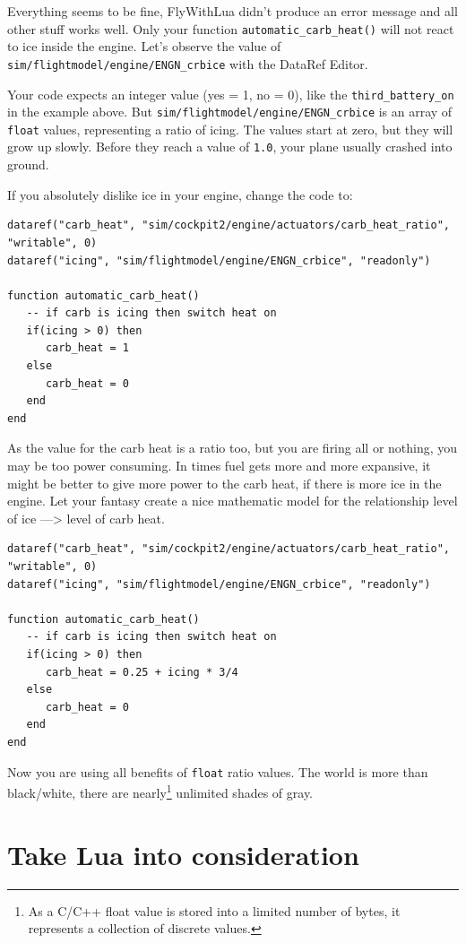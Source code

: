 \documentclass[11pt,parskip=half,a4paper]{scrartcl}
\begin{document}
Everything seems to be fine, FlyWithLua didn't produce an error message and all other stuff works well. Only your function \verb|automatic_carb_heat()| will not react to ice inside the engine. Let's observe the value of \verb|sim/flightmodel/engine/ENGN_crbice| with the DataRef Editor.

Your code expects an integer value (yes = 1, no = 0), like the \verb|third_battery_on| in the example above. But \verb|sim/flightmodel/engine/ENGN_crbice| is an array of \verb|float| values, representing a ratio of icing. The values start at zero, but they will grow up slowly. Before they reach a value of \verb|1.0|, your plane usually crashed into ground.

If you absolutely dislike ice in your engine, change the code to:

\begin{lstlisting}
dataref("carb_heat", "sim/cockpit2/engine/actuators/carb_heat_ratio", "writable", 0)
dataref("icing", "sim/flightmodel/engine/ENGN_crbice", "readonly")

function automatic_carb_heat()
   -- if carb is icing then switch heat on 
   if(icing > 0) then
      carb_heat = 1
   else
      carb_heat = 0
   end
end
\end{lstlisting}

As the value for the carb heat is a ratio too, but you are firing all or nothing, you may be too power consuming. In times fuel gets more and more expansive, it might be better to give more power to the carb heat, if there is more ice in the engine. Let your fantasy create a nice mathematic model for the relationship level of ice ---> level of carb heat.

\begin{lstlisting}
dataref("carb_heat", "sim/cockpit2/engine/actuators/carb_heat_ratio", "writable", 0)
dataref("icing", "sim/flightmodel/engine/ENGN_crbice", "readonly")

function automatic_carb_heat()
   -- if carb is icing then switch heat on 
   if(icing > 0) then
      carb_heat = 0.25 + icing * 3/4
   else
      carb_heat = 0
   end
end
\end{lstlisting}

Now you are using all benefits of \verb|float| ratio values. The world is more than black/white, there are nearly\footnote{As a C/C++ float value is stored into a limited number of bytes, it represents a collection of discrete values.} unlimited shades of gray.

\newpage
\section{Take Lua into consideration}
\end{document}
